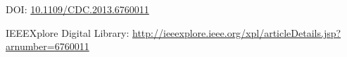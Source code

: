 \documentclass[a4paper,12pt]{article}
\newcommand{\doi}[1]{DOI: \href{http://dx.doi.org/#1}{#1}}
\begin{document}
\thispagestyle{empty}

\vspace{3cm}

\nocite{FDB-c-25}
\printbibliography

\vspace{3cm}
\doi{10.1109/CDC.2013.6760011}

\vspace{1.5cm}
IEEEXplore Digital Library:
\url{http://ieeexplore.ieee.org/xpl/articleDetails.jsp?arnumber=6760011}

\newpage

\end{document}
